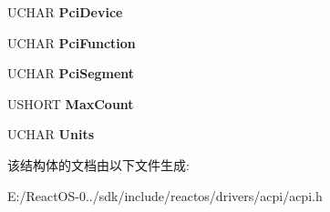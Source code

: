 \begin{DoxyCompactItemize}
U\+C\+H\+AR {\bfseries Pci\+Device}
\item 
\mbox{\label{struct___w_a_t_c_h_d_o_g___t_a_b_l_e_a4960294a451d5f265181f2146e853257}} 
U\+C\+H\+AR {\bfseries Pci\+Function}
\item 
\mbox{\label{struct___w_a_t_c_h_d_o_g___t_a_b_l_e_ae23e591396399a3b18a020e5de2a4966}} 
U\+C\+H\+AR {\bfseries Pci\+Segment}
\item 
\mbox{\label{struct___w_a_t_c_h_d_o_g___t_a_b_l_e_ac68b2ac13717fe7cdea23c19ee063883}} 
U\+S\+H\+O\+RT {\bfseries Max\+Count}
\item 
\mbox{\label{struct___w_a_t_c_h_d_o_g___t_a_b_l_e_a1d16d39d2c987021a60af403f1608c4d}} 
U\+C\+H\+AR {\bfseries Units}
\end{DoxyCompactItemize}


该结构体的文档由以下文件生成\+:\begin{DoxyCompactItemize}
\item 
E\+:/\+React\+O\+S-\/0../sdk/include/reactos/drivers/acpi/acpi.\+h\end{DoxyCompactItemize}
